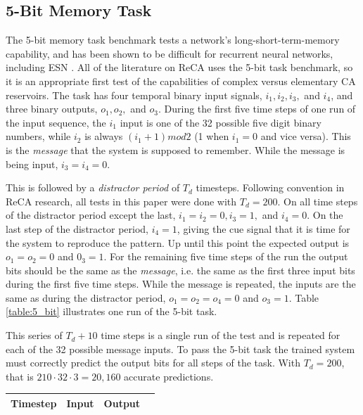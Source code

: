 \documentclass{elsarticle}
\begin{document}
\begin{multicols}{2}
	\subsection{5-Bit Memory Task}\label{5_bit}
	The 5-bit memory task benchmark tests a network's long-short-term-memory 
	capability, and has been shown to be difficult for recurrent neural networks, 
	including ESN \cite{hochreiter1997long}\cite{jaeger2012long}. All of the 
	literature on ReCA uses the 5-bit task benchmark, so it is an appropriate 
	first test of the capabilities of complex versus elementary CA reservoirs.  
	The task has four temporal binary input signals, $i_1, i_2, i_3,$ and 
	$i_4$, and three binary outputs, $o_1, o_2,$ and $o_3$.  During the
	first five time steps of one run of the input sequence, the $i_1$ input is one 
	of the 32 possible five digit binary numbers, while $i_2$ is always $(i_1 + 1) 
	mod 2$ (1 when $i_1 = 0$ and vice versa). This is the \textit{message} that 
	the system is supposed to remember. While the message is being input, $i_3 
	= i_4 = 0$.  \par  This is followed by a \textit{distractor period} of 
	$T_d$ timesteps.  Following convention in ReCA research, all tests in this 
	paper were done with $T_d = 200$.  On all time steps of the distractor 
	period except the last, $i_1 = i_2 = 0, i_3 = 1, $ and $i_4 = 0$. On the 
	last step of the distractor period, $i_4 = 1$, giving the cue signal that 
	it is time for the system to reproduce the pattern. Up until this point the 
	expected output is $o_1 = o_2 = 0 $ and $0_3 = 1$. For the remaining five 
	time steps of the run the output bits should be the same as the 
	\textit{message}, i.e.  the same as the first three input bits during the 
	first five time steps.  While the message is repeated, the inputs are the 
	same as during the distractor period, $o_1 = o_2 = o_4 = 0$ and $o_3 = 1$.  
	Table \ref{table:5_bit} illustrates one run of the 5-bit task. \par
	This series of $T_d + 10$ time steps is a single run of the test and is 
	repeated for each of the 32 possible message inputs. To pass the 5-bit task 
	the trained system must correctly predict the output bits for all steps of 
	the task. With $T_d = 200$, that is $210 \cdot 32 \cdot 3 = 20,160$ accurate 
	predictions.
	
\begin{table}[t]\centering
		\small
		\begin{tabular}{|c|l|l|l|l|l|l|l|l}
			\cline{1-8}
			\multicolumn{1}{|l|}{Timestep}&\multicolumn{4}{l|}{Input}&\multicolumn{3}{l|}{Output}&\cellcolor[HTML]{FFFFFF}{\color[HTML]{333333}}\\\hline
			

\end{tabular}
\end{table}
\end{multicols}
\end{document}
